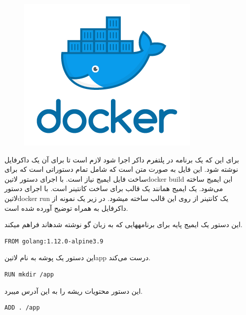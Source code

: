 \documentclass[a4]{report}
\begin{document}
\begin{figure}
\centering
\includegraphics[scale=0.25]{fig/docker}
\end{figure}

برای این که یک برنامه در پلتفرم داکر اجرا شود لازم است تا برای آن یک داکرفایل
نوشته شود. این فایل به صورت متن است که شامل تمام دستوراتی است که برای ساخت فایل ایمیج نیاز است. با اجرای دستور ‌لاتین{docker build} این ایمیج ساخته می‌شود. یک ایمیج همانند یک قالب برای ساخت کانتینر است. با اجرای دستور ‌لاتین{docker run} یک کانتینر از روی این قالب ساخته میشود.
در زیر یک نمونه از داکرفایل به همراه توضیح آورده شده است.


این دستور یک ایمیج پایه برای برنامههایی که به زبان گو نوشته شدهاند فراهم میکند.

\begin{latin}
\begin{verbatim}
FROM golang:1.12.0-alpine3.9
\end{verbatim}
\end{latin}

این دستور یک پوشه به نام ‌لاتین{app} درست می‌کند.

\begin{latin}
\begin{verbatim}
RUN mkdir /app
\end{verbatim}
\end{latin}

این دستور محتویات ریشه را به این آدرس میبرد.

\begin{latin}
\begin{verbatim}
ADD . /app
\end{verbatim}
\end{latin}
\end{document}
